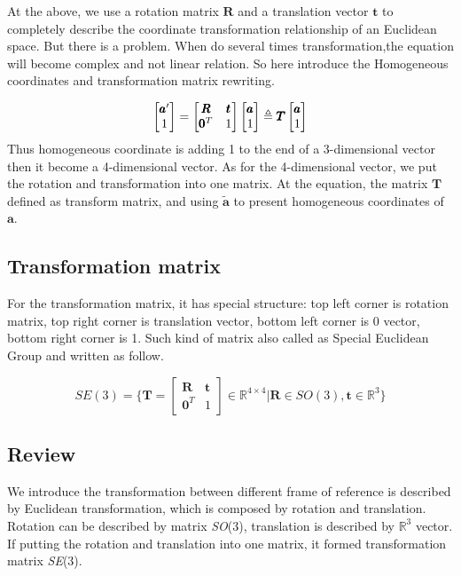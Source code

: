At the above, we use a rotation matrix $\pmb{R}$ and a translation vector $\pmb{t}$ to completely describe the coordinate transformation relationship of an Euclidean space.
But there is a problem. When do several times transformation,the equation will become complex and not linear relation. So here introduce the Homogeneous coordinates and transformation matrix rewriting.

\begin{equation}
    \begin{bmatrix} 
        \pmb{a}' \\
        1
    \end{bmatrix}=
    \begin{bmatrix}
        \pmb{R} & \pmb{t}\\
        \pmb{0}^T & 1
    \end{bmatrix}
    \begin{bmatrix}
        \pmb{a}\\
        1
    \end{bmatrix}
    \triangleq
    \pmb{T}\\
    \begin{bmatrix}
        \pmb{a}\\
        1
    \end{bmatrix}
\end{equation}
Thus homogeneous coordinate is adding 1 to the end of a 3-dimensional vector then it become a 4-dimensional vector. As for the 4-dimensional vector, we put the rotation and transformation into one matrix. At the equation, the matrix $\pmb{T}$ defined as transform matrix, and using $\pmb{\tilde{a}}$ to present homogeneous coordinates of $\pmb{a}$.

\subsection{Transformation matrix}

For the transformation matrix, it has special structure: top left corner is rotation matrix, top right corner is translation vector, bottom left corner is 0 vector, bottom right corner is 1. Such kind of matrix also called as Special Euclidean Group and written as follow.

\begin{equation}
    SE(3)=\{\pmb{T} = 
    \begin{bmatrix} 
        \pmb{R} & \pmb{t}\\
        \pmb{0}^T & 1
    \end{bmatrix} \in \mathbb{R}^{4\times4}|\pmb{R} \in SO(3),\pmb{t}
    \in \mathbb{R}^3\}
\end{equation}

\subsection{Review}

We introduce the transformation between different frame of reference is described by Euclidean transformation, which is composed by rotation and translation. Rotation can be described by matrix \emph{SO}(3), translation is described by $\mathbb{R}^3$ vector. If putting the rotation and translation into one matrix, it formed transformation matrix \emph{SE}(3).